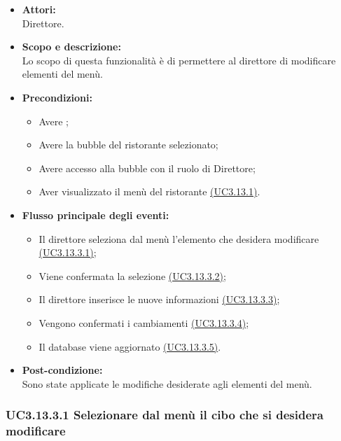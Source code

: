 \begin{itemize}
	\item \textbf{Attori:}
	\\Direttore.
	\item \textbf{Scopo e descrizione:} 
	\\Lo scopo di questa funzionalità è di permettere al direttore di modificare elementi del menù.
	\item \textbf{Precondizioni:}
	\begin{itemize}
		\item Avere ;
		\item Avere la bubble del ristorante selezionato;
		\item Avere accesso alla bubble con il ruolo di Direttore;
		\item Aver visualizzato il menù del ristorante \hyperref[UC3.13.1]{(UC3.13.1)}.
	\end{itemize}
	\item \textbf{Flusso principale degli eventi:}
	\begin{itemize}
		\item Il direttore seleziona dal menù l’elemento che desidera modificare \hyperref[UC3.13.3.1]{(UC3.13.3.1)};
		\item Viene confermata la selezione \hyperref[UC3.13.3.2]{(UC3.13.3.2)};
		\item Il direttore inserisce le nuove informazioni \hyperref[UC3.13.3.3]{(UC3.13.3.3)};
		\item Vengono confermati i cambiamenti \hyperref[UC3.13.3.4]{(UC3.13.3.4)};
		\item Il database viene aggiornato \hyperref[UC3.13.3.5]{(UC3.13.3.5)}.
	\end{itemize}
	\item \textbf{Post-condizione:}
	\\Sono state applicate le modifiche desiderate agli elementi del menù.
\end{itemize}

\subsubsection{UC3.13.3.1  Selezionare dal menù il cibo che si desidera modificare} \label{UC3.13.3.1}

